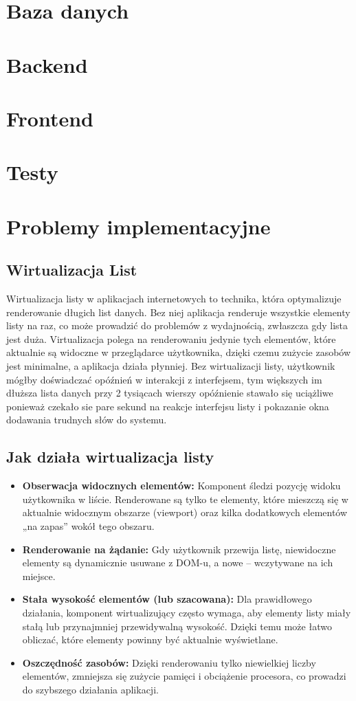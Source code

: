 \section{Baza danych}
\section{Backend}
\section{Frontend}
\section{Testy}
\section{Problemy implementacyjne}
\subsection{Wirtualizacja List}
Wirtualizacja listy w aplikacjach internetowych to technika, która optymalizuje renderowanie długich list danych. Bez niej aplikacja renderuje wszystkie elementy listy na raz, co może prowadzić do problemów z wydajnością, zwłaszcza gdy lista jest duża. Virtualizacja polega na renderowaniu jedynie tych elementów, które aktualnie są widoczne w przeglądarce użytkownika, dzięki czemu zużycie zasobów jest minimalne, a aplikacja działa płynniej. Bez wirtualizacji listy, użytkownik mógłby doświadczać opóźnień w interakcji z interfejsem, tym większych im dłuższa lista danych przy 2 tysiącach wierszy opóźnienie stawało się uciążliwe ponieważ czekało sie pare sekund na reakcje interfejsu listy i pokazanie okna dodawania trudnych słów do systemu.

\subsection*{Jak działa wirtualizacja listy}
\begin{itemize}
    \item \textbf{Obserwacja widocznych elementów:} Komponent śledzi pozycję widoku użytkownika w liście. Renderowane są tylko te elementy, które mieszczą się w aktualnie widocznym obszarze (viewport) oraz kilka dodatkowych elementów „na zapas” wokół tego obszaru.
    \item \textbf{Renderowanie na żądanie:} Gdy użytkownik przewija listę, niewidoczne elementy są dynamicznie usuwane z DOM-u, a nowe – wczytywane na ich miejsce.
    \item \textbf{Stała wysokość elementów (lub szacowana):} Dla prawidłowego działania, komponent wirtualizujący często wymaga, aby elementy listy miały stałą lub przynajmniej przewidywalną wysokość. Dzięki temu może łatwo obliczać, które elementy powinny być aktualnie wyświetlane.
    \item \textbf{Oszczędność zasobów:} Dzięki renderowaniu tylko niewielkiej liczby elementów, zmniejsza się zużycie pamięci i obciążenie procesora, co prowadzi do szybszego działania aplikacji.
\end{itemize}

